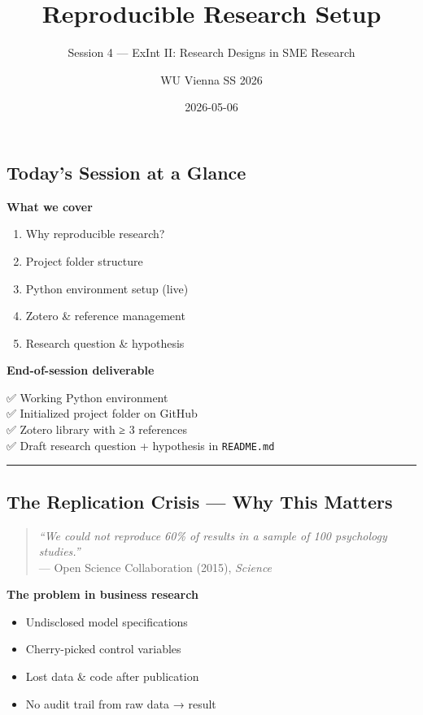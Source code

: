 \documentclass[
  letterpaper,
  DIV=11,
  numbers=noendperiod]{scrartcl}
\title{Reproducible Research Setup}
\subtitle{Session 4 --- ExInt II: Research Designs in SME Research}
\author{WU Vienna \textbar{} SS 2026}
\date{2026-05-06}
\providecommand{\tightlist}{%
  \setlength{\itemsep}{0pt}\setlength{\parskip}{0pt}}\usepackage{longtable,booktabs,array}
\begin{document}
\maketitle


\subsection{Today's Session at a
Glance}\label{todays-session-at-a-glance}

\textbf{What we cover}

\begin{enumerate}
\def\labelenumi{\arabic{enumi}.}
\tightlist
\item
  Why reproducible research?
\item
  Project folder structure
\item
  Python environment setup (live)
\item
  Zotero \& reference management
\item
  Research question \& hypothesis
\end{enumerate}

\textbf{End-of-session deliverable}

✅ Working Python environment\\
✅ Initialized project folder on GitHub\\
✅ Zotero library with ≥ 3 references\\
✅ Draft research question + hypothesis in \texttt{README.md}

\begin{center}\rule{0.5\linewidth}{0.5pt}\end{center}

\subsection{The Replication Crisis --- Why This
Matters}\label{the-replication-crisis-why-this-matters}

\begin{quote}
\emph{``We could not reproduce 60\% of results in a sample of 100
psychology studies.''}\\
--- Open Science Collaboration (2015), \emph{Science}
\end{quote}

\textbf{The problem in business research}

\begin{itemize}
\tightlist
\item
  Undisclosed model specifications
\item
  Cherry-picked control variables
\item
  Lost data \& code after publication
\item
  No audit trail from raw data → result
\end{itemize}
\end{document}

